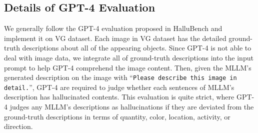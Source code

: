 \documentclass[10pt,twocolumn,letterpaper]{article}
\begin{document}














































\subsection{Details of GPT-4 Evaluation}
\label{sec:supp_4}

We generally follow the GPT-4 evaluation proposed in HalluBench \cite{2023zhiyuan} and implement it on VG dataset. 
Each image in VG \cite{krishna2017visual} dataset has the detailed ground-truth descriptions about all of the appearing objects. 
Since GPT-4 is not able to deal with image data, we integrate all of ground-truth descriptions into the input prompt to help GPT-4 comprehend the image content. 
Then, given the MLLM's generated description on the image with ``\texttt{Please describe this image in detail.}'', GPT-4 are required to judge whether each sentences of MLLM's description has hallucinated contents. 
This evaluation is quite strict, where GPT-4 judges any MLLM's descriptions as hallucinations if they are deviated from the ground-truth descriptions in terms of quantity, color, location, activity, or direction.
\end{document}
